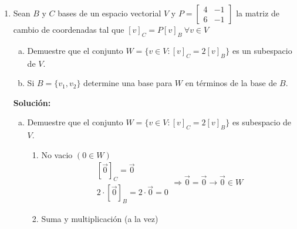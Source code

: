 \documentclass[12pt]{article}
\newenvironment{solucion}
{\begin{mdframed}[backgroundcolor=black!10]
		{\bf Solución:}\\
	}
	{
	\end{mdframed}
}
\newenvironment{preguntas}
{\begin{enumerate}\itemsep12pt
	}
	{
	\end{enumerate}
}
\newcommand{\ra}{\rightarrow}
\begin{document}
\begin{preguntas}
\begin{solucion}
		Para encontrar esta matriz, basta con obtener la inversa de la matriz cambio de base dada, esto es
		$$ \left[\begin{array}{ccc|ccc}
		1 & 0 & -1 & 1 & 0 & 0\\
		1 & 1 & 0 & 0 & 1 & 0\\
		0 & 1 & 2 & 0 & 0 & 1
		\end{array}\right] \sim 
		\left[\begin{array}{ccc|ccc}
		1 & 0 & 0 & 2 & -1 & 1\\
		0 & 1 & 0 & -2 & 2 & -1\\
		0 & 0 & 1 & 1 & -1 & 1
		\end{array}\right]$$
		con lo que
		$$A_{B_2}^{B_1} = \begin{bmatrix}
		2 & -1 & 1\\
		-2 & 2 & -1\\
		1 & -1 & 1
		\end{bmatrix}$$
		Sea 
		$$B_2 = \{q_1(x), q_2(x), q_3(x)\}$$
		Las columnas de $A_{B_2}^{B_1}$ corresponden a los vectores de coordenada de $q_1$, $q_2$ y $q_3$, respectivamente, en la base $B_1$.
		
		Luego,
		$$q_1(x) = 2(1+x) - 2(1-x) + (1+x^2) = 1+4x+x^2$$
		$$q_2(x) = -(1+x) + 2(1-x) - (1+x^2) = -3x-x^2$$
		$$q_3(x) = (1+x) - (1-x) + (1+x^2) = 1+2x+x^2$$
		Finalmente,
		$$B_2 = \{1+4x+x^2,-3x-x^2,1+2x+x^2\}$$
\end{solucion}
\item Sean $B$ y $C$ bases de un espacio vectorial $V$ y $P = \begin{bmatrix}4 &-1 \\ 6 & -1\end{bmatrix}$ la matriz de cambio de coordenadas tal que $[v]_C = P[v]_B\ \forall v \in V$
\begin{enumerate}[a)]
\item Demuestre que el conjunto $W = \{v \in V: [v]_C = 2[v]_B\}$ es un subespacio de $V$.
\item Si $B=\{v_1,v_2\}$ determine una base para $W$ en términos de la base de $B$.
\end{enumerate}
\begin{solucion}

\begin{enumerate}[a)]
\item Demuestre que el conjunto $W = \{v \in V: [v]_C = 2[v]_B\}$ es subespacio de $V$.
			
			\begin{enumerate}
				\item No vacio $(0\in W)$
				$$\begin{array}{cc}
				[\vec{0}]_C = \vec{0}\\
				2 \cdot [\vec{0}]_B = 2 \cdot \vec{0} = 0
				\end{array} \Longrightarrow \vec{0} = \vec{0} \ra \vec{0} \in W$$	
				\item Suma y multiplicación (a la vez)	
				

\end{enumerate}
\end{enumerate}
\end{solucion}
\end{preguntas}
\end{document}
